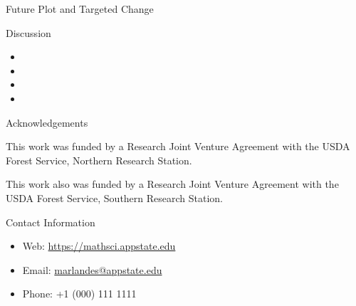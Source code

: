 \documentclass[final]{beamer}\usepackage[]{graphicx}\usepackage[]{color}
\newlength{\onecolwid}
\begin{document}
\begin{frame}[t]
\begin{columns}[t]
\begin{column}{\onecolwid}
\begin{block}{Future Plot and Targeted Change}
\end{block}


\begin{block}{Discussion}

\begin{itemize}
\item 
\item 
\item 
\item
\end{itemize}

\end{block}





\begin{block}{Acknowledgements}

This work was funded by a Research Joint Venture Agreement with the USDA Forest Service, Northern Research Station.

This work also was funded by a Research Joint Venture Agreement with the USDA Forest Service, Southern Research Station.

\end{block}



\begin{alertblock}{Contact Information}

\begin{itemize}
\item Web: \href{https://mathsci.appstate.edu}{https://mathsci.appstate.edu}
\item Email: \href{marlandes@appstate.edu}{marlandes@appstate.edu}
\item Phone: +1 (000) 111 1111
\end{itemize}


\end{alertblock}
\end{column}
\end{columns}
\end{frame}
\end{document}
